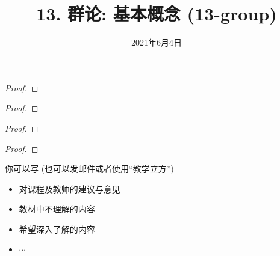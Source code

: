\documentclass[a4paper, justified]{tufte-handout}
\title{13. 群论: 基本概念 (13-group)}
\date{2021年6月4日}
\begin{document}
\maketitle
\noplagiarism %
\begin{abstract}
\end{abstract}
\beginrequired

\begin{problem}[\score{5 = 2 + 3} $\star\star$]
\end{problem}

\begin{proof}
\end{proof}

\begin{problem}
\end{problem}

\begin{proof}
\end{proof}

\begin{problem}
\end{problem}

\begin{proof}
\end{proof}

\begin{problem}
\end{problem}

\begin{proof}
\end{proof}

\begincorrection

\beginfb

你可以写 (也可以发邮件或者使用``教学立方'')
\begin{itemize}
  \item 对课程及教师的建议与意见
  \item 教材中不理解的内容
  \item 希望深入了解的内容
  \item $\cdots$
\end{itemize}
\end{document}
